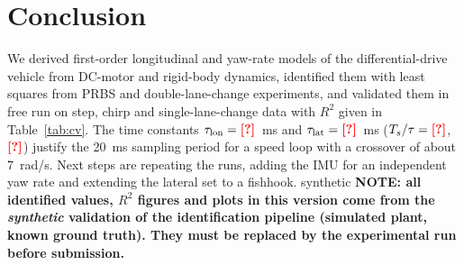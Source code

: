 \documentclass[conference]{IEEEtran}\newcommand{\haveieee}{}%
\newcommand{\todo}[1]{{\color{red}\textbf{[#1]}}}
\providecommand{\DataSource}{\todo{?}}
\newcommand{\fallbackmacros}{\todo{?}}
\providecommand{\LonTauMs}{\fallbackmacros}\providecommand{\LonK}{\fallbackmacros}
\providecommand{\TsOverTauLon}{\fallbackmacros}\providecommand{\TsOverTauLat}{\fallbackmacros}
\def\synth{synthetic}
\newcommand{\synthnote}{\ifx\DataSource\synth
  {\color{red}\textbf{NOTE: all identified values, $R^2$ figures and plots in this version come from the \emph{synthetic} validation of the identification pipeline (simulated plant, known ground truth). They must be replaced by the experimental run before submission.}}\fi}
\begin{document}
\section{Conclusion}
We derived first-order longitudinal and yaw-rate models of the differential-drive vehicle from DC-motor and rigid-body dynamics, identified them with least squares from PRBS and double-lane-change experiments, and validated them in free run on step, chirp and single-lane-change data with $R^2$ given in Table~\ref{tab:cv}. The time constants $\tau_\mathrm{lon}=\LonTauMs$~ms and $\tau_\mathrm{lat}=\LatTauMs$~ms ($T_s/\tau=\TsOverTauLon$, $\TsOverTauLat$) justify the 20~ms sampling period for a speed loop with a crossover of about 7~rad/s. Next steps are repeating the runs, adding the IMU for an independent yaw rate and extending the lateral set to a fishhook. \synthnote

\balance


\end{document}
